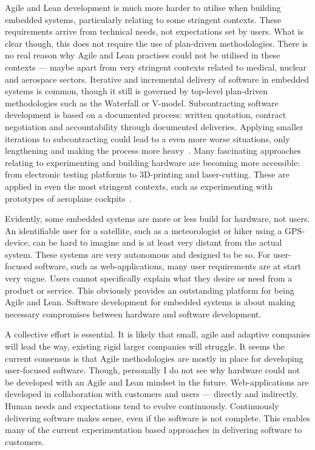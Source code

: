 \documentclass[english]{tktltiki2}
\begin{document}
Agile and Lean development is much more harder to utilise when building embedded systems, particularly relating to some stringent contexts. These requirements arrive from technical needs, not expectations set by users. What is clear though, this does not require the use of plan-driven methodologies. There is no real reason why Agile and Lean practises could not be utilised in these contexts — maybe apart from very stringent contexts related to medical, nuclear and aerospace sectors. Iterative and incremental delivery of software in embedded systems is common, though it still is governed by top-level plan-driven methodologies such as the Waterfall or V-model. Subcontracting software development is based on a documented process: written quotation, contract negotiation and accountability through documented deliveries. Applying smaller iterations to subcontracting could lead to a even more worse situations, only lengthening and making the process more heavy~\cite{Hol15b}. Many fascinating approaches relating to experimenting and building hardware are becoming more accessible: from electronic testing platforms to 3D-printing and laser-cutting. These are applied in even the most stringent contexts, such as experimenting with prototypes of aeroplane cockpits~\cite{Air15}.

Evidently, some embedded systems are more or less build for hardware, not users. An identifiable user for a satellite, such as a meteorologist or hiker using a GPS-device, can be hard to imagine and is at least very distant from the actual system. These systems are very autonomous and designed to be so. For user-focused software, such as web-applications, many user requirements are at start very vague. Users cannot specifically explain what they desire or need from a product or service. This obviously provides an outstanding platform for being Agile and Lean. Software development for embedded systems is about making necessary compromises between hardware and software development.

A collective effort is essential. It is likely that small, agile and adaptive companies will lead the way, existing rigid larger companies will struggle. It seems the current consensus is that Agile methodologies are mostly in place for developing user-focused software. Though, personally I do not see why hardware could not be developed with an Agile and Lean mindset in the future. Web-applications are developed in collaboration with customers and users — directly and indirectly. Human needs and expectations tend to evolve continuously. Continuously delivering software makes sense, even if the software is not complete. This enables many of the current experimentation based approaches in delivering software to customers.
\end{document}
